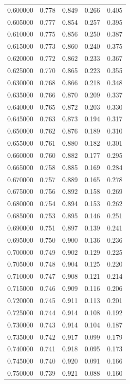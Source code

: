 \begin{table}[htbp]
\begin{tabular}{lllll}
0.600000 & 0.778 & 0.849 & 0.266 & 0.405 \\
0.605000 & 0.777 & 0.854 & 0.257 & 0.395 \\
0.610000 & 0.775 & 0.856 & 0.250 & 0.387 \\
0.615000 & 0.773 & 0.860 & 0.240 & 0.375 \\
0.620000 & 0.772 & 0.862 & 0.233 & 0.367 \\
0.625000 & 0.770 & 0.865 & 0.223 & 0.355 \\
0.630000 & 0.768 & 0.866 & 0.218 & 0.348 \\
0.635000 & 0.766 & 0.870 & 0.209 & 0.337 \\
0.640000 & 0.765 & 0.872 & 0.203 & 0.330 \\
0.645000 & 0.763 & 0.873 & 0.194 & 0.317 \\
0.650000 & 0.762 & 0.876 & 0.189 & 0.310 \\
0.655000 & 0.761 & 0.880 & 0.182 & 0.301 \\
0.660000 & 0.760 & 0.882 & 0.177 & 0.295 \\
0.665000 & 0.758 & 0.885 & 0.169 & 0.284 \\
0.670000 & 0.757 & 0.889 & 0.165 & 0.278 \\
0.675000 & 0.756 & 0.892 & 0.158 & 0.269 \\
0.680000 & 0.754 & 0.894 & 0.153 & 0.262 \\
0.685000 & 0.753 & 0.895 & 0.146 & 0.251 \\
0.690000 & 0.751 & 0.897 & 0.139 & 0.241 \\
0.695000 & 0.750 & 0.900 & 0.136 & 0.236 \\
0.700000 & 0.749 & 0.902 & 0.129 & 0.225 \\
0.705000 & 0.748 & 0.904 & 0.125 & 0.220 \\
0.710000 & 0.747 & 0.908 & 0.121 & 0.214 \\
0.715000 & 0.746 & 0.909 & 0.116 & 0.206 \\
0.720000 & 0.745 & 0.911 & 0.113 & 0.201 \\
0.725000 & 0.744 & 0.914 & 0.108 & 0.192 \\
0.730000 & 0.743 & 0.914 & 0.104 & 0.187 \\
0.735000 & 0.742 & 0.917 & 0.099 & 0.179 \\
0.740000 & 0.741 & 0.918 & 0.095 & 0.173 \\
0.745000 & 0.740 & 0.920 & 0.091 & 0.166 \\
0.750000 & 0.739 & 0.921 & 0.088 & 0.160 \\

\end{tabular}
\end{table}
